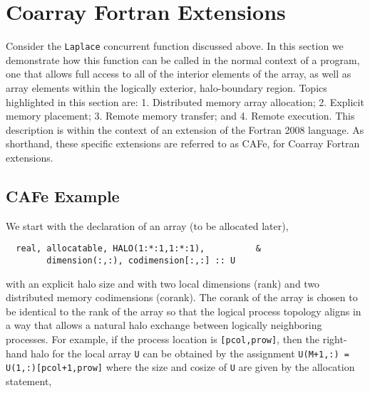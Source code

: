 \section{Coarray Fortran Extensions}


Consider the \texttt{Laplace} concurrent function discussed above.  In
this section we demonstrate how this function can be called in the
normal context of a program, one that allows full access to all of the
interior elements of the array, as well as array elements within the
logically exterior, halo-boundary region.  Topics highlighted in this
section are: 1. Distributed memory array allocation; 2. Explicit
memory placement; 3. Remote memory transfer; and 4. Remote execution.
This description is within the context of an extension of the Fortran
2008 language.  As shorthand, these specific extensions are referred
to as CAFe, for Coarray Fortran extensions.

\subsection{CAFe Example}

We start with the declaration of an array (to be allocated later),
\begin{verbatim}
  real, allocatable, HALO(1:*:1,1:*:1),          &
        dimension(:,:), codimension[:,:] :: U
\end{verbatim}

with an explicit halo size and with two local dimensions (rank) and
two distributed memory codimensions (corank).  The corank of the array
is chosen to be identical to the rank of the array so that the logical
process topology aligns in a way that allows a natural halo exchange
between logically neighboring processes.  For example, if the process
location is \texttt{[pcol,prow]}, then the right-hand halo for the
local array \texttt{U} can be obtained by the assignment
\texttt{U(M+1,:) = U(1,:)[pcol+1,prow]} where the size and cosize of
\texttt{U} are given by the allocation statement,

